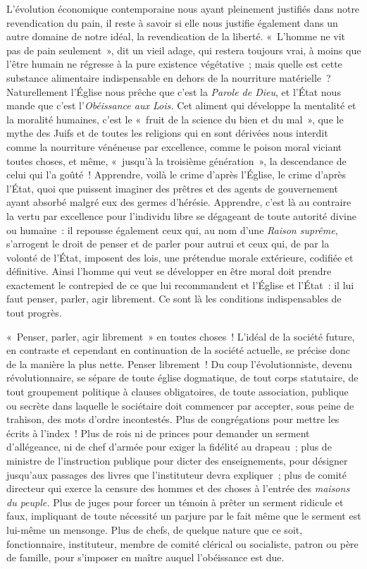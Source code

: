 \documentclass[french,twoside]{book} %
\begin{document}
 L’évolution économique contemporaine nous ayant pleinement justifiés dans notre revendication du pain, il reste à savoir si elle nous justifie également dans un autre domaine de notre idéal, la revendication de la liberté. « L’homme ne vit pas de pain seulement », dit un vieil adage, qui restera toujours vrai, à moins que l’être humain ne régresse à la pure existence végétative ; mais quelle est cette substance alimentaire indispensable en dehors de la nourriture matérielle ? Naturellement l’Église nous prêche que c’est la \emph{Parole de Dieu}, et l’État nous mande que c’est l’\emph{Obéissance aux Lois.} Cet aliment qui développe la mentalité et la moralité humaines, c’est le « fruit de la science du bien et du mal », que le mythe des  Juifs et de toutes les religions qui en sont dérivées nous interdit comme la nourriture vénéneuse par excellence, comme le poison moral viciant toutes choses, et même, « jusqu’à la troisième génération », la descendance de celui qui l’a goûté ! Apprendre, voilà le crime d’après l’Église, le crime d’après l’État, quoi que puissent imaginer des prêtres et des agents de gouvernement ayant absorbé malgré eux des germes d’hérésie. Apprendre, c’est là au contraire la vertu par excellence pour l’individu libre se dégageant de toute autorité divine ou humaine : il repousse également ceux qui, au nom d’une \emph{Raison suprême}, s’arrogent le droit de penser et de parler pour autrui et ceux qui, de par la volonté de l’État, imposent des lois, une  prétendue morale extérieure, codifiée et définitive. Ainsi l’homme qui veut se développer en être moral doit prendre exactement le contrepied de ce que lui recommandent et l’Église et l’État : il lui faut penser, parler, agir librement. Ce sont là les conditions indispensables de tout progrès.\par
« Penser, parler, agir librement » en toutes choses ! L’idéal de la société future, en contraste et cependant en continuation de la société actuelle, se précise donc de la manière la plus nette. Penser librement ! Du coup l’évolutionniste, devenu révolutionnaire, se sépare de toute église dogmatique, de tout corps statutaire, de tout groupement politique à clauses obligatoires, de toute association, publique ou  secrète dans laquelle le sociétaire doit commencer par accepter, sous peine de trahison, des mots d’ordre incontestés. Plus de congrégations pour mettre les écrits à l’index ! Plus de rois ni de princes pour demander un serment d’allégeance, ni de chef d’armée pour exiger la fidélité au drapeau ; plus de ministre de l’instruction publique pour dicter des enseignements, pour désigner jusqu’aux passages des livres que l’instituteur devra expliquer ; plus de comité directeur qui exerce la censure des hommes et des choses à l’entrée des \emph{maisons du peuple.} Plus de juges pour forcer un témoin à prêter un serment ridicule et faux, impliquant de toute nécessité un parjure par le fait même que le serment est lui-même un mensonge. Plus de  chefs, de quelque nature que ce soit, fonctionnaire, instituteur, membre de comité clérical ou socialiste, patron ou père de famille, pour s’imposer en maître auquel l’obéissance est due.\par
\end{document}
